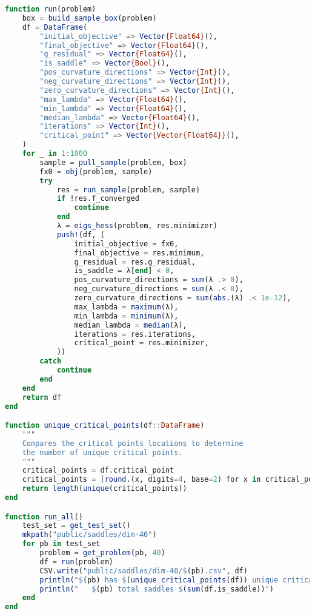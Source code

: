 \documentclass[10pt]{article}
\begin{document}
\begin{lstlisting}[language=julia, caption={Algorithm 16.5}, label={lst:problem-sampling}]
function run(problem)
    box = build_sample_box(problem)
    df = DataFrame(
        "initial_objective" => Vector{Float64}(),
        "final_objective" => Vector{Float64}(), 
        "g_residual" => Vector{Float64}(),
        "is_saddle" => Vector{Bool}(),
        "pos_curvature_directions" => Vector{Int}(),
        "neg_curvature_directions" => Vector{Int}(),
        "zero_curvature_directions" => Vector{Int}(),
        "max_lambda" => Vector{Float64}(),
        "min_lambda" => Vector{Float64}(),
        "median_lambda" => Vector{Float64}(),
        "iterations" => Vector{Int}(),
        "critical_point" => Vector{Vector{Float64}}(),  
    )
    for _ in 1:1000
        sample = pull_sample(problem, box)
        fx0 = obj(problem, sample)
        try
            res = run_sample(problem, sample)
            if !res.f_converged
                continue
            end
            λ = eigs_hess(problem, res.minimizer)
            push!(df, (
                initial_objective = fx0,
                final_objective = res.minimum,
                g_residual = res.g_residual,
                is_saddle = λ[end] < 0,
                pos_curvature_directions = sum(λ .> 0),
                neg_curvature_directions = sum(λ .< 0),
                zero_curvature_directions = sum(abs.(λ) .< 1e-12),
                max_lambda = maximum(λ),
                min_lambda = minimum(λ),
                median_lambda = median(λ),
                iterations = res.iterations,
                critical_point = res.minimizer,
            ))
        catch
            continue
        end
    end
    return df
end

function unique_critical_points(df::DataFrame)
    """
    Compares the critical points locations to determine
    the number of unique critical points.
    """
    critical_points = df.critical_point
    critical_points = [round.(x, digits=4, base=2) for x in critical_points] # HACK d
    return length(unique(critical_points))
end

function run_all()
    test_set = get_test_set()
    mkpath("public/saddles/dim-40")
    for pb in test_set
        problem = get_problem(pb, 40)
        df = run(problem)
        CSV.write("public/saddles/dim-40/$(pb).csv", df)
        println("$(pb) has $(unique_critical_points(df)) unique critical points.")
        println("   $(pb) total saddles $(sum(df.is_saddle))")
    end
end
\end{lstlisting}
\newpage
\end{document}
